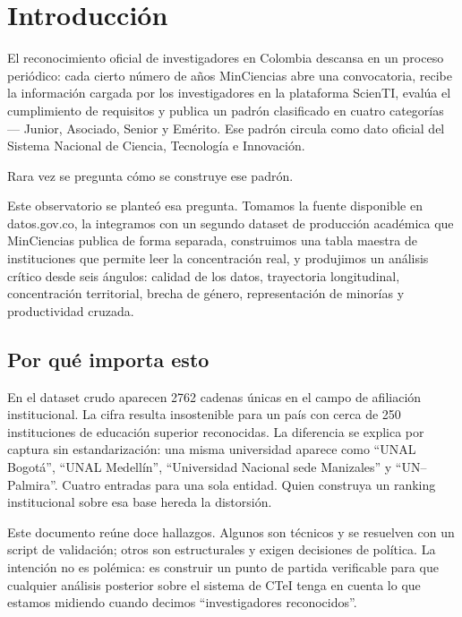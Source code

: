 \documentclass[11pt,a4paper,oneside]{article}
\begin{document}
\section{Introducción}\label{sec:intro}

El reconocimiento oficial de investigadores en Colombia descansa en un proceso periódico: cada cierto número de años MinCiencias abre una convocatoria, recibe la información cargada por los investigadores en la plataforma ScienTI, evalúa el cumplimiento de requisitos y publica un padrón clasificado en cuatro categorías --- Junior, Asociado, Senior y Emérito. Ese padrón circula como dato oficial del Sistema Nacional de Ciencia, Tecnología e Innovación.

Rara vez se pregunta cómo se construye ese padrón.

Este observatorio se planteó esa pregunta. Tomamos la fuente disponible en datos.gov.co, la integramos con un segundo dataset de producción académica que MinCiencias publica de forma separada, construimos una tabla maestra de instituciones que permite leer la concentración real, y produjimos un análisis crítico desde seis ángulos: calidad de los datos, trayectoria longitudinal, concentración territorial, brecha de género, representación de minorías y productividad cruzada.

\subsection{Por qué importa esto}

En el dataset crudo aparecen \num{2762} cadenas únicas en el campo de afiliación institucional. La cifra resulta insostenible para un país con cerca de 250 instituciones de educación superior reconocidas. La diferencia se explica por captura sin estandarización: una misma universidad aparece como ``UNAL Bogotá'', ``UNAL Medellín'', ``Universidad Nacional sede Manizales'' y ``UN--Palmira''. Cuatro entradas para una sola entidad. Quien construya un ranking institucional sobre esa base hereda la distorsión.

Este documento reúne doce hallazgos. Algunos son técnicos y se resuelven con un script de validación; otros son estructurales y exigen decisiones de política. La intención no es polémica: es construir un punto de partida verificable para que cualquier análisis posterior sobre el sistema de CTeI tenga en cuenta lo que estamos midiendo cuando decimos ``investigadores reconocidos''.
\end{document}
